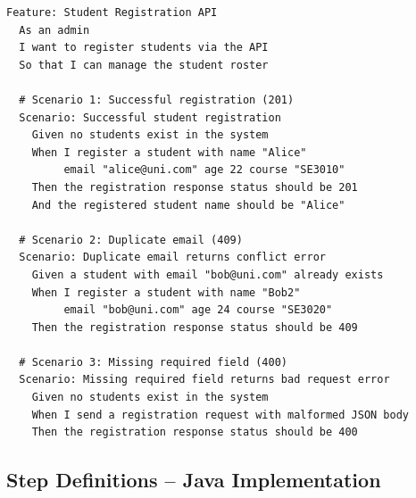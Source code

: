 \documentclass[12pt,a4paper]{article}
\begin{document}
\begin{lstlisting}[style=gherkinstyle, caption={\texttt{student\_registration.feature} -- BDD scenarios in Gherkin}]
Feature: Student Registration API
  As an admin
  I want to register students via the API
  So that I can manage the student roster

  # Scenario 1: Successful registration (201)
  Scenario: Successful student registration
    Given no students exist in the system
    When I register a student with name "Alice"
         email "alice@uni.com" age 22 course "SE3010"
    Then the registration response status should be 201
    And the registered student name should be "Alice"

  # Scenario 2: Duplicate email (409)
  Scenario: Duplicate email returns conflict error
    Given a student with email "bob@uni.com" already exists
    When I register a student with name "Bob2"
         email "bob@uni.com" age 24 course "SE3020"
    Then the registration response status should be 409

  # Scenario 3: Missing required field (400)
  Scenario: Missing required field returns bad request error
    Given no students exist in the system
    When I send a registration request with malformed JSON body
    Then the registration response status should be 400
\end{lstlisting}

\subsection{Step Definitions -- Java Implementation}
\end{document}
